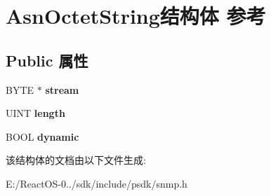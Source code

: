 \hypertarget{struct_asn_octet_string}{}\section{Asn\+Octet\+String结构体 参考}
\label{struct_asn_octet_string}
\subsection*{Public 属性}
\begin{DoxyCompactItemize}
\item 
\mbox{\label{struct_asn_octet_string_a98ac8c9102974d283fa37c3626168f43}} 
B\+Y\+TE $\ast$ {\bfseries stream}
\item 
\mbox{\label{struct_asn_octet_string_a5737753292e803da67f9d18f4ff69934}} 
U\+I\+NT {\bfseries length}
\item 
\mbox{\label{struct_asn_octet_string_a0a25f479d4f123858fb521e9a374fc6a}} 
B\+O\+OL {\bfseries dynamic}
\end{DoxyCompactItemize}


该结构体的文档由以下文件生成\+:\begin{DoxyCompactItemize}
\item 
E\+:/\+React\+O\+S-\/0../sdk/include/psdk/snmp.\+h\end{DoxyCompactItemize}
